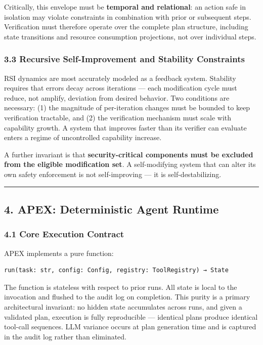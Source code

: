 \documentclass[
]{article}
\begin{document}
Critically, this envelope must be \textbf{temporal and relational}: an
action safe in isolation may violate constraints in combination with
prior or subsequent steps. Verification must therefore operate over the
complete plan structure, including state transitions and resource
consumption projections, not over individual steps.

\subsubsection{3.3 Recursive Self-Improvement and Stability
Constraints}\label{33-recursive-self-improvement-and-stability-constraints}

RSI dynamics are most accurately modeled as a feedback system. Stability
requires that errors decay across iterations --- each modification cycle
must reduce, not amplify, deviation from desired behavior. Two
conditions are necessary: (1) the magnitude of per-iteration changes
must be bounded to keep verification tractable, and (2) the verification
mechanism must scale with capability growth. A system that improves
faster than its verifier can evaluate enters a regime of uncontrolled
capability increase.

A further invariant is that \textbf{security-critical components must be
excluded from the eligible modification set}. A self-modifying system
that can alter its own safety enforcement is not self-improving --- it
is self-destabilizing.

\begin{center}\rule{0.5\linewidth}{0.5pt}\end{center}

\subsection{4. APEX: Deterministic Agent
Runtime}\label{4-apex-deterministic-agent-runtime}

\subsubsection{4.1 Core Execution
Contract}\label{41-core-execution-contract}

APEX implements a pure function:

\begin{verbatim}
run(task: str, config: Config, registry: ToolRegistry) → State
\end{verbatim}

The function is stateless with respect to prior runs. All state is local
to the invocation and flushed to the audit log on completion. This
purity is a primary architectural invariant: no hidden state accumulates
across runs, and given a validated plan, execution is fully reproducible
--- identical plans produce identical tool-call sequences. LLM variance
occurs at plan generation time and is captured in the audit log rather
than eliminated.
\end{document}
